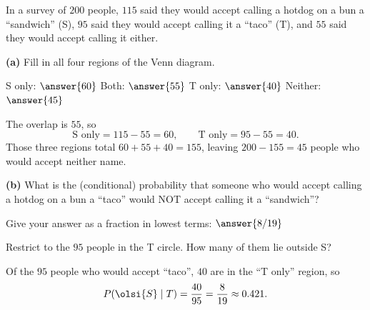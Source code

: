 \documentclass[12pt]{ximera}
\begin{document}
\begin{problem}
In a survey of $200$ people, $115$ said they would accept calling a hotdog on a bun a
``sandwich'' (S), $95$ said they would accept calling it a ``taco'' (T), and $55$ said
they would accept calling it either.

\begin{prompt}
\textbf{(a)} Fill in all four regions of the Venn diagram.

\begin{center}
\end{center}

S only: $\answer{60}$ \qquad
Both: $\answer{55}$ \qquad
T only: $\answer{40}$ \qquad
Neither: $\answer{45}$

\begin{solution}
The overlap is $55$, so
\[
\text{S only} = 115-55 = 60, \qquad \text{T only} = 95-55 = 40.
\]
Those three regions total $60+55+40=155$, leaving $200-155=45$ people who would
accept neither name.
\end{solution}
\end{prompt}

\begin{prompt}
\textbf{(b)} What is the (conditional) probability that someone who would accept
calling a hotdog on a bun a ``taco'' would NOT accept calling it a ``sandwich''?

Give your answer as a fraction in lowest terms: $\answer{8/19}$

\begin{hint}
Restrict to the $95$ people in the T circle. How many of them lie outside S?
\end{hint}

\begin{solution}
Of the $95$ people who would accept ``taco'', $40$ are in the ``T only'' region, so
\[
P\!\left(\olsi{S}\mid T\right)=\frac{40}{95}=\frac{8}{19}\approx 0.421.
\]
\end{solution}
\end{prompt}
\end{problem}
\end{document}
